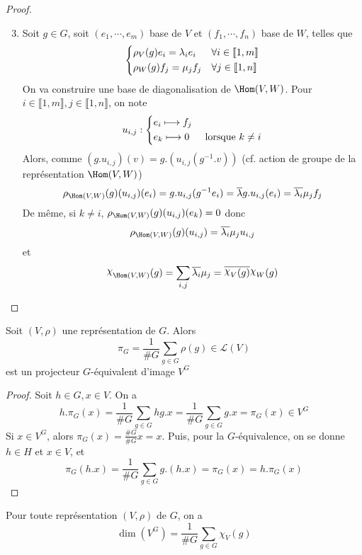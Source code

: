 \begin{proof}
\begin{enumerate}
    \setcounter{enumi}{2}
\item Soit $g \in  G$, soit $(e_1, \cdots , e_m)$ base de $V$ et  $(f_1, \cdots , f_n)$ base de $W$, telles que  \[
\begin{dcases}
    \rho_V(g)e_i=\lambda_i e_i & \forall  i \in  \llbracket 1, m \rrbracket \\
    \rho_W(g)f_j=\mu_jf_j & \forall  j \in  \llbracket 1, n \rrbracket 
\end{dcases}
\] 
On va construire une base de diagonalisation de $\Hom(V, W)$. Pour $i \in  \llbracket 1,m \rrbracket , j \in  \llbracket 1,n \rrbracket $, on note \[
u_{i,j}: \begin{dcases}
    e_i\longmapsto f_j\\
    e_k \longmapsto 0 & \text{ lorsque }k\neq i
\end{dcases}
\]
Alors, comme $(g.u_{i,j})(v)=g.(u_{i,j}(g^{-1}.v))$ (cf. action de groupe de la représentation $\Hom(V, W)$) \[
    \rho_{\Hom(V, W)}(g)(u_{i,j})(e_i)=g.u_{i,j}(g^{-1}e_i)=\bar{\lambda} g.u_{i,j}(e_i)=\bar{\lambda_i}\mu_j f_j
\]
De même, si $k\neq i$,  $\rho_{\Hom(V, W)}(g)(u_{i,j})(e_k)=0$ donc \[\rho_{\Hom(V, W)}(g)(u_{i,j})=\bar{\lambda_i}\mu_ju_{i,j}\] et \[
\chi_{\Hom(V, W)}(g)=\sum_{i,j}\bar{\lambda_i}\mu_j=\bar{\chi_V(g)}\chi_W(g)
\] 
\end{enumerate}
\end{proof}

\begin{prop}
    Soit $(V, \rho)$ une représentation de  $G$. Alors  \[
        \pi_G=\frac1{\#G} \sum_{g \in  G}\rho(g) \in  \mathcal  L(V)
    \] 
    est un projecteur $G$-équivalent d'image  $V^G$
\end{prop}

\begin{proof}
    Soit  $h \in  G, x \in  V$. On a \[
        h.\pi_G(x)=\frac1{\#G}\sum_{g \in  G}hg.x=\frac1{\#G}\sum_{g \in  G}g.x=\pi_G(x) \in V^G
    \] 
    Si $x \in  V^G$, alors $\pi_G(x)=\frac{\#G}{\#G}x=x$. Puis, pour la  $G$-équivalence, on se donne  $h \in  H$ et $x \in  V$, et \[
        \pi_G(h.x)=\frac1{\#G}\sum_{g \in  G}g.(h.x)=\pi_G(x)=h.\pi_G(x)
    \] 
\end{proof}

\begin{cor}
    Pour toute représentation $(V, \rho)$ de $G$, on a \[
        \dim(V^G)=\frac1{\#G}\sum_{g \in  G}\chi_V(g)
    \] 
\end{cor}

